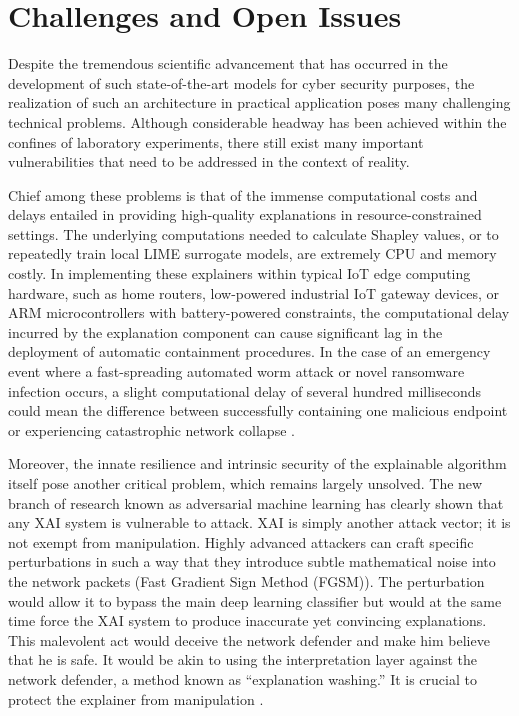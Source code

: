 \documentclass[12pt]{article}
\begin{document}
    \section{Challenges and Open Issues}
    Despite the tremendous scientific advancement that has occurred in the development of such state-of-the-art models for cyber security purposes, the realization of such an architecture in practical application poses many challenging technical problems. Although considerable headway has been achieved within the confines of laboratory experiments, there still exist many important vulnerabilities that need to be addressed in the context of reality.

    Chief among these problems is that of the immense computational costs and delays entailed in providing high-quality explanations in resource-constrained settings. The underlying computations needed to calculate Shapley values, or to repeatedly train local LIME surrogate models, are extremely CPU and memory costly. In implementing these explainers within typical IoT edge computing hardware, such as home routers, low-powered industrial IoT gateway devices, or ARM microcontrollers with battery-powered constraints, the computational delay incurred by the explanation component can cause significant lag in the deployment of automatic containment procedures. In the case of an emergency event where a fast-spreading automated worm attack or novel ransomware infection occurs, a slight computational delay of several hundred milliseconds could mean the difference between successfully containing one malicious endpoint or experiencing catastrophic network collapse \cite{ijcrt2025threat, chen2022explainable}.

    Moreover, the innate resilience and intrinsic security of the explainable algorithm itself pose another critical problem, which remains largely unsolved. The new branch of research known as adversarial machine learning has clearly shown that any XAI system is vulnerable to attack. XAI is simply another attack vector; it is not exempt from manipulation. Highly advanced attackers can craft specific perturbations in such a way that they introduce subtle mathematical noise into the network packets (Fast Gradient Sign Method (FGSM)). The perturbation would allow it to bypass the main deep learning classifier but would at the same time force the XAI system to produce inaccurate yet convincing explanations. This malevolent act would deceive the network defender and make him believe that he is safe. It would be akin to using the interpretation layer against the network defender, a method known as “explanation washing.” It is crucial to protect the explainer from manipulation \cite{ieee2024limeshap, nguyen2022explainable}.
\end{document}
